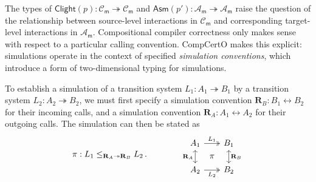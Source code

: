 \documentclass[acmsmall,screen,review,anonymous]{acmart}
\newcommand{\kw}[1]{\ensuremath{ \mathsf{#1} }}
\begin{document}
The types of
$\kw{Clight}(p) : \mathcal{C}_\kw{m} \twoheadrightarrow \mathcal{C}_\kw{m}$ and
$\kw{Asm}(p') : \mathcal{A}_\kw{m} \twoheadrightarrow \mathcal{A}_\kw{m}$
raise the question of the relationship
between source-level interactions
in $\mathcal{C}_\kw{m}$
and corresponding target-level interactions
in $\mathcal{A}_\kw{m}$.
Compositional compiler correctness only makes sense
with respect to a particular calling convention.
%
CompCertO makes this explicit:
simulations operate in the context of specified
\emph{simulation conventions},
which introduce a form of two-dimensional typing for simulations.

To establish a simulation
of a transition system $L_1: A_1 \twoheadrightarrow B_1$
by a transition system $L_2: A_2 \twoheadrightarrow B_2$,
we must first specify a simulation convention
$\mathbf{R}_B : B_1 \leftrightarrow B_2$
for their incoming calls,
and a simulation convention
$\mathbf{R}_A : A_1 \leftrightarrow A_2$
for their outgoing calls.
The simulation can then be stated as
\begin{equation} \label{eqn:compcerto-sim}
  \pi : L_1 \le_{\mathbf{R}_A \twoheadrightarrow \mathbf{R}_B} L_2
  \,.
  \qquad
  \qquad
  \begin{tikzcd}[sep=0.5ex]
    A_1 \ar[dd, leftrightarrow, "\mathbf{R}_A"']
        \ar[rr, twoheadrightarrow, "L_1"] &&
    B_1 \ar[dd, leftrightarrow, "\mathbf{R}_B"] \\
    & \pi & \\
    A_2 \ar[rr, twoheadrightarrow, "L_2"'] &&
    B_2
  \end{tikzcd}
\end{equation}
%
\end{document}
